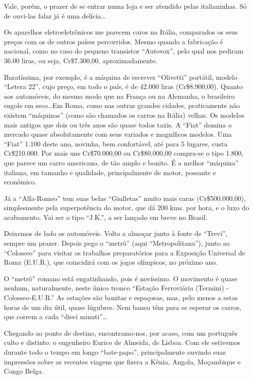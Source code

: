 Vale, porém, o prazer de se entrar numa loja e ser atendido pelas italianinhas. Só de ouvi-las falar já é uma delícia\ldots

Os aparelhos eletroeletrônicos me parecem caros na Itália, comparados os seus preços com os de outros países percorridos. Mesmo quando a fabricação é nacional, como no caso do pequeno transistor “Autovox”, pelo qual nos pediram 36.00 liras, ou seja, Cr\$7.300,00, aproximadamente.

Baratíssima, por exemplo, é a máquina de escrever “Olivetti” portátil, modelo “Letera 22”, cujo preço, em todo o país, é de 42.000 liras (Cr\$8.900,00). Quanto aos automóveis, do mesmo modo que na França ou na Alemanha, o brasileiro engole em seco\ldots Em Roma, como nas outras grandes cidades, praticamente não existem “máquinas” (como são chamados os carros na Itália) velhas. Os modelos mais antigos que dois ou três anos são quase todos taxis. A “Fiat” domina o mercado quase absolutamente com seus variados e magníficos modelos. Uma “Fiat” 1.100 deste ano, novinha, bem confortável, até para 5 lugares, custa Cr\$210.000. Por mais uns Cr\$70.000,00 ou Cr\$80.000,00 compra-se o tipo 1.800, que parece um carro americano, de tão amplo e bonito. É a melhor “máquina” italiana, em tamanho e qualidade, principalmente de motor, possante e econômico.

Já a “Alfa-Romeo” tem suas belas “Giulletas” muito mais caras (Cr\$500.000,00), simplesmente pela superpotência do motor, que dá 200 kms. por hora, e o luxo do acabamento. Vai ser o tipo “J.K.”, a ser lançado em breve no Brasil.

Deixemos de lado os automóveis. Volto a almoçar junto à fonte de “Trevi”, sempre um prazer. Depois pego o “metrô” (aqui “Metropolitana”), junto ao “Colosseo” para visitar os trabalhos preparatórios para a Exposição Universal de Roma (E.U.R.), que coincidirá com os jogos olímpicos, no próximo ano.

O “metrô” romano está engatinhando, pois é novíssimo. O movimento é quase nenhum, naturalmente, neste único tronco “Estação Ferroviária (Termini) - Colosseo-E.U.R.” As estações são bonitas e espaçosas, mas, pelo menos a estas horas de um dia útil, quase lúgubres. Nem banco têm para se esperar os carros, que correm a cada “dieci minuti”\ldots

Chegando ao ponto de destino, encontramo-nos, por acaso, com um português culto e distinto: o engenheiro Eurico de Almeida, de Lisboa. Com ele estivemos durante todo o tempo em longo “bate-papo”, principalmente ouvindo suas impressões sobre as recentes viagens que fizera a Kênia, Angola, Moçambique e Congo Belga.

